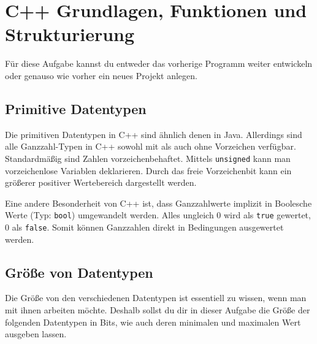 \section{\ExercisePrefixBasics C++ Grundlagen, Funktionen und Strukturierung}
\label{sec:basics}
Für diese Aufgabe kannst du entweder das vorherige Programm weiter entwickeln oder genauso wie vorher ein neues Projekt anlegen.

\subsection*{Primitive Datentypen} 
Die primitiven Datentypen in C++ sind ähnlich denen in Java.
Allerdings sind alle Ganzzahl-Typen in C++ sowohl mit als auch ohne Vorzeichen verfügbar.
Standardmäßig sind Zahlen vorzeichenbehaftet.
Mittels \lstinline{unsigned} kann man vorzeichenlose Variablen deklarieren.
Durch das freie Vorzeichenbit kann ein größerer positiver Wertebereich dargestellt werden.


Eine andere Besonderheit von C++ ist, dass Ganzzahlwerte implizit in Boolesche Werte (Typ: \lstinline{bool}) umgewandelt werden.
Alles ungleich 0 wird als \lstinline{true} gewertet, 0 als \lstinline{false}.
Somit können Ganzzahlen direkt in Bedingungen ausgewertet werden.

\subsection{Größe von Datentypen}
Die Größe von den verschiedenen Datentypen ist essentiell zu wissen, wenn man mit ihnen arbeiten möchte.
Deshalb sollst du dir in dieser Aufgabe die Größe der folgenden Datentypen in Bits, wie auch deren minimalen und maximalen Wert ausgeben lassen.



